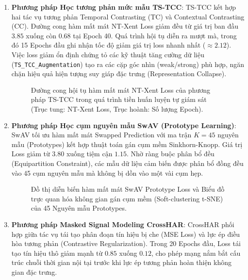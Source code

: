\begin{enumerate}
    \item \textbf{Phương pháp Học tương phản mức mẫu TS-TCC}:
    TS-TCC kết hợp hai tác vụ tương phản Temporal Contrasting (TC) và Contextual Contrasting (CC). Đường cong hàm mất mát NT-Xent Loss giảm đều từ giá trị ban đầu $3.85$ xuống còn $0.68$ tại Epoch 40. Quá trình hội tụ diễn ra mượt mà, trong đó 15 Epochs đầu ghi nhận tốc độ giảm giá trị loss nhanh nhất ($\approx 2.12$). Việc loss giảm ổn định chứng tỏ các kỹ thuật tăng cường dữ liệu (\texttt{TS\_TCC\_Augmentation}) tạo ra các cặp góc nhìn (weak/strong) phù hợp, ngăn chặn hiệu quả hiện tượng suy giáp đặc trưng (Representation Collapse).

    \begin{figure}[h!]
    \centering
    \caption{Đường cong hội tụ hàm mất mát NT-Xent Loss của phương pháp TS-TCC trong quá trình tiền huấn luyện tự giám sát (Trục tung: NT-Xent Loss, Trục hoành: Số lượng Epoch).}
    \label{fig:pretrain_tstcc_loss}
    \end{figure}

    \item \textbf{Phương pháp Học cụm nguyên mẫu SwAV (Prototype Learning)}:
    SwAV tối ưu hàm mất mát Swapped Prediction với ma trận $K=45$ nguyên mẫu (Prototypes) kết hợp thuật toán gán cụm mềm Sinkhorn-Knopp. Giá trị Loss giảm từ $3.80$ xuống tiệm cận $1.15$. Nhờ ràng buộc phân bổ đều (Equipartition Constraint), các mẫu dữ liệu cảm biến được phân bổ đồng đều vào 45 cụm nguyên mẫu mà không bị dồn vào một vài cụm hẹp.

    \begin{figure}[h!]
    \centering
    \caption{Đồ thị diễn biến hàm mất mát SwAV Prototype Loss và Biểu đồ trực quan hóa không gian gán cụm mềm (Soft-clustering t-SNE) của 45 Nguyên mẫu Prototypes.}
    \label{fig:pretrain_swav_tsne}
    \end{figure}

    \item \textbf{Phương pháp Masked Signal Modeling CrossHAR}:
    CrossHAR phối hợp giữa tác vụ tái tạo phân đoạn tín hiệu bị che (MSE Loss) và lực ép điều hòa tương phản (Contrastive Regularization). Trong 20 Epochs đầu, Loss tái tạo tín hiệu thô giảm mạnh từ $0.85$ xuống $0.12$, cho phép mạng nắm bắt cấu trúc chuỗi thời gian nội tại trước khi lực ép tương phản hoàn thiện không gian đặc trưng.


\end{enumerate}
